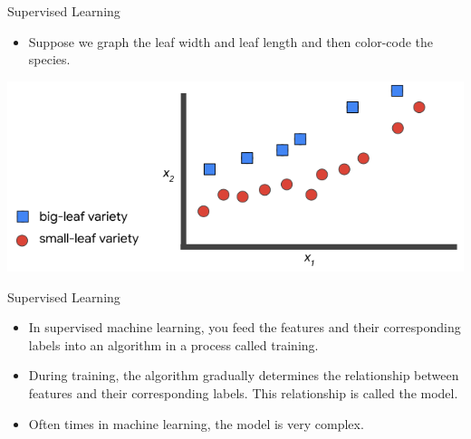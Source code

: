 \documentclass{beamer}
\begin{document}
\begin{frame}{Supervised Learning}

\begin{itemize}
\item Suppose we graph the leaf width and leaf length and then color-code the species.
\end{itemize}

\bigskip

\includegraphics[width=\textwidth]{images/Graph1.png}

\end{frame}


\begin{frame}{Supervised Learning}

\begin{itemize}
\item In supervised machine learning, you feed the features and their corresponding labels into an algorithm in a process called training. 

\item During training, the algorithm gradually determines the relationship between features and their corresponding labels. This relationship is called the model. 

\item Often times in machine learning, the model is very complex. 

\end{itemize}

\end{frame}
\end{document}
